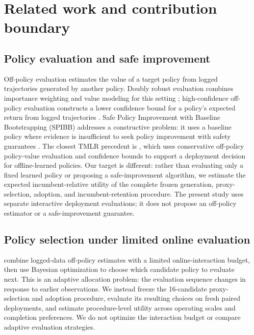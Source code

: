 \documentclass[10pt,letterpaper]{article}
\begin{document}
\section{Related work and contribution boundary}
\subsection{Policy evaluation and safe improvement}
Off-policy evaluation estimates the value of a target policy from logged trajectories generated by another policy. Doubly robust evaluation combines importance weighting and value modeling for this setting \citep{jiang2016}; high-confidence off-policy evaluation constructs a lower confidence bound for a policy's expected return from logged trajectories \citep{thomas2015}. Safe Policy Improvement with Baseline Bootstrapping (SPIBB) addresses a constructive problem: it uses a baseline policy where evidence is insufficient to seek policy improvement with safety guarantees \citep{laroche2019}. The closest TMLR precedent is \citet{abdelwahed2024conservative}, which uses conservative off-policy policy-value evaluation and confidence bounds to support a deployment decision for offline-learned policies. Our target is different: rather than evaluating only a fixed learned policy or proposing a safe-improvement algorithm, we estimate the expected incumbent-relative utility of the complete frozen generation, proxy-selection, adoption, and incumbent-retention procedure. The present study uses separate interactive deployment evaluations; it does not propose an off-policy estimator or a safe-improvement guarantee.

\subsection{Policy selection under limited online evaluation}
\citet{konyushkova2021active} combine logged-data off-policy estimates with a limited online-interaction budget, then use Bayesian optimization to choose which candidate policy to evaluate next. This is an adaptive allocation problem: the evaluation sequence changes in response to earlier observations. We instead freeze the 16-candidate proxy-selection and adoption procedure, evaluate its resulting choices on fresh paired deployments, and estimate procedure-level utility across operating scales and completion preferences. We do not optimize the interaction budget or compare adaptive evaluation strategies.
\end{document}
